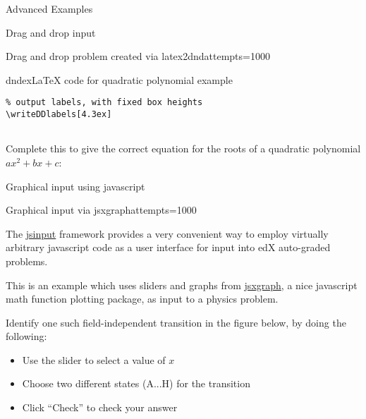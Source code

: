 \begin{edXchapter}{Advanced Examples}
\begin{edXsection}{Drag and drop input}
\begin{edXvertical}
\begin{edXproblem}{Drag and drop problem created via latex2dnd}{attempts=1000}
\begin{edXshowhide}{dndex}{LaTeX code for quadratic polynomial example}
\begin{verbatim}
% output labels, with fixed box heights
\writeDDlabels[4.3ex]


\end{verbatim}
\end{edXshowhide}

Complete this to give the correct equation for the roots of a
quadratic polynomial $ax^2 + bx + c$:


\end{edXproblem}


\end{edXvertical}

\end{edXsection}


\begin{edXsection}{Graphical input using javascript}

\begin{edXvertical}

\begin{edXproblem}{Graphical input via jsxgraph}{attempts=1000}

The \href{http://edx.readthedocs.org/projects/devdata/en/latest/course_data_formats/jsinput.html}{jsinput} framework provides a very convenient way to
employ virtually arbitrary javascript code as a user interface for
input into edX auto-graded problems.  

This is an example which uses sliders and graphs from
\href{http://jsxgraph.uni-bayreuth.de/}{jsxgraph}, a nice javascript
math function plotting package, as input to a physics problem.

     Identify one such field-independent transition in the figure
     below, by doing the following:
     \begin{itemize}
     \item Use the slider to select a value of $x$
     \item Choose two different states (A...H) for the transition
     \item Click ``Check'' to check your answer
     \end{itemize}




\end{edXproblem}
\end{edXvertical}
\end{edXsection}
\end{edXchapter}
